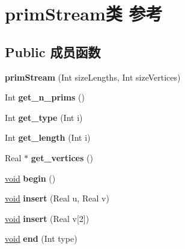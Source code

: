 \hypertarget{classprim_stream}{}\section{prim\+Stream类 参考}
\label{classprim_stream}
\subsection*{Public 成员函数}
\begin{DoxyCompactItemize}
\item 
\mbox{\label{classprim_stream_a8e6ee6642b390a5e9d997a275b807775}} 
{\bfseries prim\+Stream} (Int size\+Lengths, Int size\+Vertices)
\item 
\mbox{\label{classprim_stream_a8a482da2b4ac0e5f4ff23e157e37ca65}} 
Int {\bfseries get\+\_\+n\+\_\+prims} ()
\item 
\mbox{\label{classprim_stream_a8b9b29f96dbe3e373f9e0b1e0af2bef9}} 
Int {\bfseries get\+\_\+type} (Int i)
\item 
\mbox{\label{classprim_stream_a79c85a0361e8511e466dbe5e886de0b3}} 
Int {\bfseries get\+\_\+length} (Int i)
\item 
\mbox{\label{classprim_stream_a77612a127aeb340d152c3bea8704067f}} 
Real $\ast$ {\bfseries get\+\_\+vertices} ()
\item 
\mbox{\label{classprim_stream_a111b7baab3e4cb8431a223d1616cfd66}} 
\hyperlink{interfacevoid}{void} {\bfseries begin} ()
\item 
\mbox{\label{classprim_stream_a9d06e2933c7713f030c9645954b7b69f}} 
\hyperlink{interfacevoid}{void} {\bfseries insert} (Real u, Real v)
\item 
\mbox{\label{classprim_stream_a52b5921afd0fb21192223c850c21eea5}} 
\hyperlink{interfacevoid}{void} {\bfseries insert} (Real v\mbox{[}2\mbox{]})
\item 
\mbox{\label{classprim_stream_aa616e5b005271ac1ab0f8e13be34cc1f}} 
\hyperlink{interfacevoid}{void} {\bfseries end} (Int type)

\end{DoxyCompactItemize}
